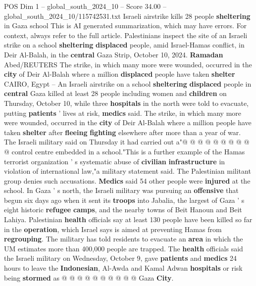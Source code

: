\begin{textsample}{POS Dim 1 – global\_south\_2024\_10 – Score 34.00 – global\_south\_2024\_10/115742531.txt}  \label{ex:f1_pos_163}
Israeli airstrike kills 28 people \textbf{sheltering} in Gaza school This is AI generated summarization, which may have errors.
For context, always refer to the full article.
Palestinians inspect the site of an Israeli strike on a school \textbf{sheltering} \textbf{displaced} people, amid Israel-Hamas conflict, in Deir Al-Balah, in the \textbf{central} Gaza Strip, October 10, 2024. \textbf{Ramadan} Abed/REUTERS The strike, in which many more were wounded, occurred in the \textbf{city} of Deir Al-Balah where a million \textbf{displaced} people have taken \textbf{shelter} CAIRO, Egypt -- An Israeli airstrike on a school \textbf{sheltering} \textbf{displaced} people in \textbf{central} Gaza killed at least 28 people including women and \textbf{children} on Thursday, October 10, while three \textbf{hospitals} in the north were told to evacuate, putting \textbf{patients} ' lives at risk, \textbf{medics} said.
The strike, in which many more were wounded, occurred in the \textbf{city} of Deir Al-Balah where a million people have taken \textbf{shelter} after \textbf{fleeing} \textbf{fighting} elsewhere after more than a year of war.
The Israeli military said on Thursday it had carried out a"@ @ @ @ @ @ @ @ @ @ control centre embedded in a school."This is a further example of the Hamas terrorist organization ' s systematic abuse of \textbf{civilian} \textbf{infrastructure} in violation of international law,"a military statement said.
The Palestinian militant group denies such accusations. \textbf{Medics} said 54 other people were \textbf{injured} at the school.
In Gaza ' s north, the Israeli military was pursuing an \textbf{offensive} that begun six days ago when it sent its \textbf{troops} into Jabalia, the largest of Gaza ' s eight historic \textbf{refugee} \textbf{camps}, and the nearby towns of Beit Hanoun and Beit Lahiya.
Palestinian \textbf{health} officials say at least 130 people have been killed so far in the \textbf{operation}, which Israel says is aimed at preventing Hamas from \textbf{regrouping}.
The military has told residents to evacuate an \textbf{area} in which the UM estimates more than 400,000 people are trapped.
The \textbf{health} officials said the Israeli military on Wednesday, October 9, gave \textbf{patients} and \textbf{medics} 24 hours to leave the \textbf{Indonesian}, Al-Awda and Kamal Adwan \textbf{hospitals} or risk being \textbf{stormed} as @ @ @ @ @ @ @ @ @ @ Gaza \textbf{City}.

\end{textsample}
